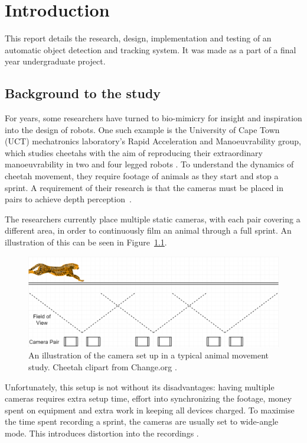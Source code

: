 \chapter{Introduction}
This report details the research, design, implementation and testing of an automatic object detection and tracking system. It was made as a part of a final year undergraduate project.

\section{Background to the study}
For years, some researchers have turned to bio-mimicry for insight and inspiration into the design of robots. One such example is the University of Cape Town (UCT) mechatronics laboratory's Rapid Acceleration and Manoeuvrability group, which studies cheetahs with the aim of reproducing their extraordinary manoeuvrability in two and four legged robots \cite{website:uct_mechatronics}. To understand the dynamics of cheetah movement, they require footage of animals as they start and stop a sprint. A requirement of their research is that the cameras must be placed in pairs to achieve depth perception~\cite{website:depth_perception_from_stereo_camera}.

The researchers currently place multiple static cameras, with each pair covering a different area, in order to continuously film an animal through a full sprint. An illustration of this can be seen in Figure~\ref{fig:multiple_gopro_pairs}. \\

\begin{figure}[h!]
  \centering
  \includegraphics[width=\textwidth]{multiple_gopro_pairs}
  \caption{\label{fig:multiple_gopro_pairs} An illustration of the camera set up in a typical animal movement study. Cheetah clipart from Change.org \cite{website:pic_of_cheetah}.}
\end{figure}

Unfortunately, this setup is not without its disadvantages: having multiple cameras requires extra setup time, effort into synchronizing the footage, money spent on equipment and extra work in keeping all devices charged. To maximise the time spent recording a sprint, the cameras are usually set to wide-angle mode. This introduces distortion into the recordings \cite{website:camera_distorion}.

